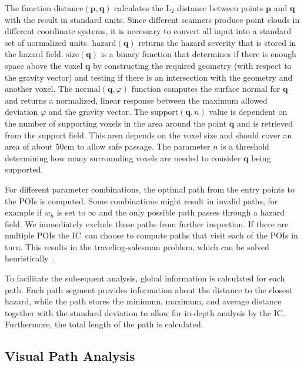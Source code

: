\documentclass[review,journal]{vgtc}         %
\def\IC{IC}
\begin{document}
The function $\textrm{distance}(\mathbf{p},\mathbf{q})$ calculates the L$_2$ distance between points $\mathbf{p}$ and $\mathbf{q}$ with the result in standard units. Since different scanners produce point clouds in different coordinate systems, it is necessary to convert all input into a standard set of normalized units. $\textrm{hazard}(\mathbf{q})$ returns the hazard severity that is stored in the hazard field. $\textrm{size}(\mathbf{q})$ is a binary function that determines if there is enough space above the voxel $\mathbf{q}$ by constructing the required geometry (with respect to the gravity vector) and testing if there is an intersection with the geometry and another voxel. The $\textrm{normal}(\mathbf{q},\varphi)$ function computes the surface normal for $\mathbf{q}$ and returns a normalized, linear response between the maximum allowed deviation $\varphi$ and the gravity vector. The $\mathrm{support}(\mathbf{q},n)$ value is dependent on the number of supporting voxels in the area around the point $\mathbf{q}$ and is retrieved from the support field. This area depends on the voxel size and should cover an area of about 50cm to allow safe passage. The parameter $n$ is a threshold determining how many surrounding voxels are needed to consider $\mathbf{q}$ being supported.

For different parameter combinations, the optimal path from the entry points to the POIs is computed. Some combinations might result in invalid paths, for example if $w_h$ is set to $\infty$ and the only possible path passes through a hazard field. We immediately exclude those paths from further inspection. If there are multiple POIs the \IC\ can choose to compute paths that visit each of the POIs in turn. This results in the traveling-salesman problem, which can be solved heuristically~\cite{4569756}.

To facilitate the subsequent analysis, global information is calculated for each path. Each path segment provides information about the distance to the closest hazard, while the path stores the minimum, maximum, and average distance together with the standard deviation to allow for in-depth analysis by the \IC. Furthermore, the total length of the path is calculated. 


\subsection{Visual Path Analysis} \label{sec:overview:pathanalysis}
\end{document}
